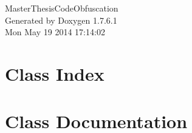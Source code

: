 \documentclass[a4paper]{book}
\begin{document}
\begin{titlepage}
\vspace*{7cm}
\begin{center}
{\Large \-Master\-Thesis\-Code\-Obfuscation }\\
\vspace*{1cm}
{\large \-Generated by Doxygen 1.7.6.1}\\
\vspace*{0.5cm}
{\small Mon May 19 2014 17:14:02}\\
\end{center}
\end{titlepage}
\clearemptydoublepage
{}
\tableofcontents
\clearemptydoublepage
{}
\chapter{\-Class \-Index}

\chapter{\-Class \-Documentation}





\printindex
\end{document}
